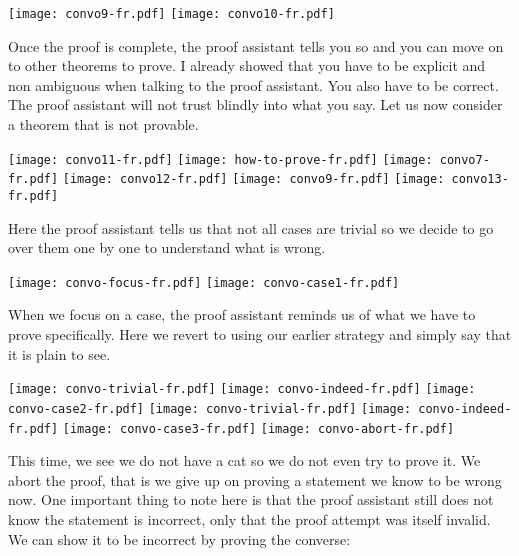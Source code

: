 \begin{center}
  \texttt{[image: convo9-fr.pdf]}
  \texttt{[image: convo10-fr.pdf]}
\end{center}

Once the proof is complete, the proof assistant tells you so and you can move on
to other theorems to prove. I already showed that you have to be explicit and
non ambiguous when talking to the proof assistant. You also have to be correct.
The proof assistant will not trust blindly into what you say.
%
Let us now consider a theorem that is not provable.

\begin{center}
  \texttt{[image: convo11-fr.pdf]}
  \texttt{[image: how-to-prove-fr.pdf]}
  \texttt{[image: convo7-fr.pdf]}
  \texttt{[image: convo12-fr.pdf]}
  \texttt{[image: convo9-fr.pdf]}
  \texttt{[image: convo13-fr.pdf]}
\end{center}

Here the proof assistant tells us that not all cases are trivial so we decide
to go over them one by one to understand what is wrong.

\begin{center}
  \texttt{[image: convo-focus-fr.pdf]}
  \texttt{[image: convo-case1-fr.pdf]}
\end{center}

When we focus on a case, the proof assistant reminds us of what we have to prove
specifically. Here we revert to using our earlier strategy and simply say that
it is plain to see.

\begin{center}
  \texttt{[image: convo-trivial-fr.pdf]}
  \texttt{[image: convo-indeed-fr.pdf]}
  \texttt{[image: convo-case2-fr.pdf]}
  \texttt{[image: convo-trivial-fr.pdf]}
  \texttt{[image: convo-indeed-fr.pdf]}
  \texttt{[image: convo-case3-fr.pdf]}
  \texttt{[image: convo-abort-fr.pdf]}
\end{center}

This time, we see we do not have a cat so we do not even try to prove it.
We abort the proof, that is we give up on proving a statement we know to be
wrong now.
One important thing to note here is that the proof assistant still does not
know the statement is incorrect, only that the proof attempt was itself invalid.
We can show it to be incorrect by proving the converse:

